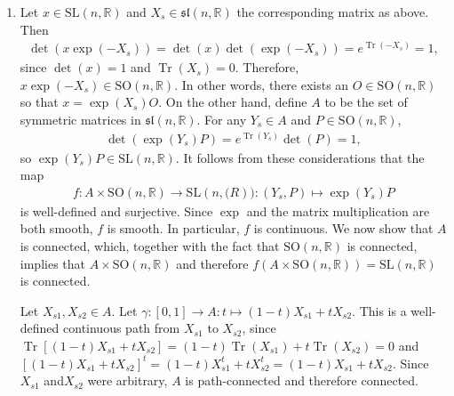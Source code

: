 \documentclass{article}
\DeclareMathOperator{\Tr}{Tr}
\newcommand{\bb}{\mathbb}
\theoremstyle{remark}
\newcommand{\SL}{\mathrm{SL}}
\begin{document}
\begin{enumerate}[label=(\roman*)]
    \item Let $x \in \SL(n,\bb{R})$ and $X_s \in \mathfrak{sl}(n,\bb{R})$ the corresponding matrix as above. Then
    \begin{align*}
        \det\left(x \exp(-X_s)\right) = \det(x) \det\left(\exp(-X_s)\right) = e^{\Tr(-X_s)} = 1,
    \end{align*}
    since $\det(x)=1$ and $\Tr(X_s) = 0$. Therefore, $x \exp(-X_s) \in \mathrm{SO}(n,\bb{R})$. In other words, there exists an $O \in \mathrm{SO}(n,\bb{R})$ so that $x = \exp(X_s)O$. On the other hand, define $A$ to be the set of symmetric matrices in $\mathfrak{sl}(n,\bb{R})$. For any $Y_s \in A$ and $P \in \mathrm{SO}(n,\bb{R})$,
    \begin{align*}
        \det\left(\exp(Y_s) P\right) = e^{\Tr(Y_s)} \det(P) = 1,
    \end{align*}
    so $\exp(Y_s) P \in \SL(n,\bb{R})$. It follows from these considerations that the map
    \begin{align*}
        f : A \times \mathrm{SO}(n,\bb{R}) \to \SL(n,\bb(R)) : (Y_s, P) \mapsto \exp(Y_s)P
    \end{align*}
    is well-defined and surjective. Since $\exp$ and the matrix multiplication are both smooth, $f$ is smooth. In particular, $f$ is continuous. We now show that $A$ is connected, which, together with the fact that $\mathrm{SO}(n,\bb{R})$ is connected, implies that $A \times \mathrm{SO}(n,\bb{R})$ and therefore $f(A \times \mathrm{SO}(n,\bb{R})) = \SL(n,\bb{R})$ is connected.
    
    Let $X_{s1}, X_{s2} \in A$. Let $\gamma : [0,1] \to A : t \mapsto (1-t)X_{s1} + tX_{s2}$. This is a well-defined continuous path from $X_{s1}$ to $X_{s2}$, since $\Tr\left[(1-t)X_{s1} + tX_{s2}\right] = (1-t)\Tr(X_{s1}) + t\Tr(X_{s2}) = 0$ and $\left[(1-t)X_{s1} + tX_{s2}\right]^t = (1-t)X_{s1}^t + tX_{s2}^t = (1-t)X_{s1} + tX_{s2}$. Since $X_{s1}$ and$X_{s2}$ were arbitrary, $A$ is path-connected and therefore connected.
\end{enumerate}
\end{document}
